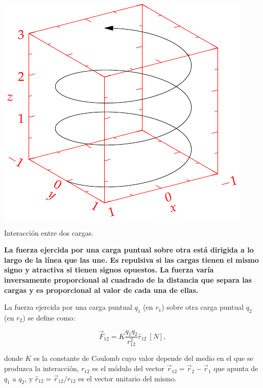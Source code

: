 \documentclass{tufte-handout}
\begin{document}
\begin{marginfigure}%
    \includegraphics[width=\linewidth]{helix}
    \caption{Interacción entre dos cargas.}
    \label{fig:leycoulomb}
\end{marginfigure}

\textbf{La fuerza ejercida por una carga puntual sobre otra está dirigida a lo largo de la línea que las une. Es repulsiva si las cargas tienen el mismo signo y atractiva si tienen signos opuestos. La fuerza varía inversamente proporcional al cuadrado de la distancia que separa las cargas y es proporcional al valor de cada una de ellas.}

La fuerza ejercida por una carga puntual $q_1$ (en $r_1$) sobre otra carga puntual $q_2$ (en $r_2$) se define como:

\begin{equation}
    \vec{F}_{12} = K\displaystyle\frac{q_1q_2}{r_{12}^2}\hat{r}_{12}~[N],
\end{equation}

donde $K$ es la constante de Coulomb cuyo valor depende del medio en el que se produzca la interacción, $r_{12}$ es el módulo del vector $\vec{r}_{12} = \vec{r}_2 - \vec{r}_1$ que apunta de $q_1$ a $q_2$, y $\hat{r}_{12} = \vec{r}_{12} / r_{12}$ es el vector unitario del mismo.
\end{document}
